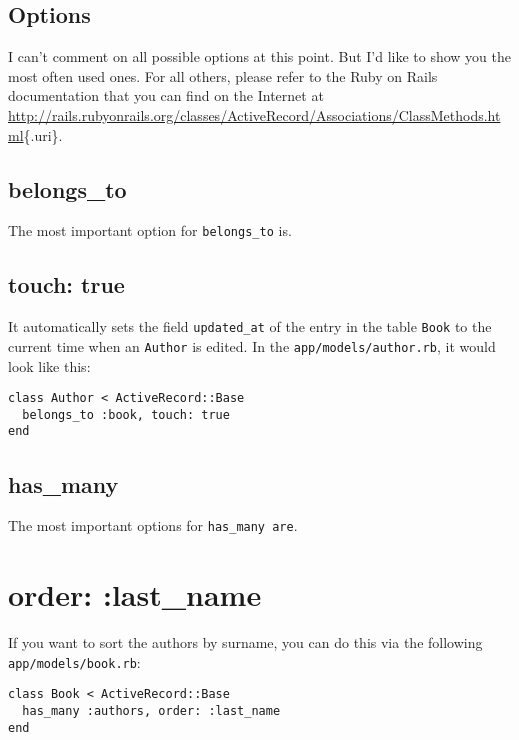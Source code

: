 \documentclass[a4paper]{book}
\newcounter{tab}[chapter]
\newcommand{\chap}[1]{\newpage\thispagestyle{empty}\chapter{#1}\label{chap:\thechapter}}
\begin{document}
\section{Options}\label{options}

I can't comment on all possible options at this point. But I'd like to show you the most often used ones. For all others, please refer to the Ruby on Rails documentation that you can find on the Internet at \url{http://rails.rubyonrails.org/classes/ActiveRecord/Associations/ClassMethods.html}\{.uri\}.

\section{belongs\_to}\label{belongsux5fto}

The most important option for \texttt{belongs\_to} is.

\section{touch: true}\label{touch-true}

It automatically sets the field \texttt{updated\_at} of the entry in the table \texttt{Book} to the current time when an \texttt{Author} is edited. In the \texttt{app/models/author.rb}, it would look like this:

\begin{shaded}\begin{verbatim}
class Author < ActiveRecord::Base
  belongs_to :book, touch: true
end
\end{verbatim}\end{shaded}

\section{has\_many}\label{hasux5fmany}

The most important options for \texttt{has\_many are}.

\chap{order: :last\_name}\label{order-lastux5fname}

If you want to sort the authors by surname, you can do this via the following \texttt{app/models/book.rb}:

\begin{shaded}\begin{verbatim}
class Book < ActiveRecord::Base
  has_many :authors, order: :last_name
end
\end{verbatim}\end{shaded}
\end{document}
